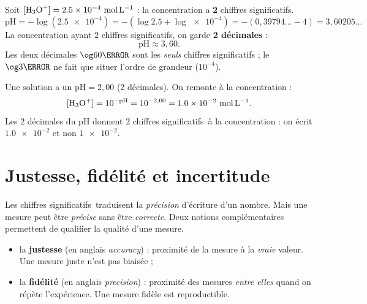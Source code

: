 \documentclass[11pt,a4paper]{article}
\newcommand{\CS}{chiffres significatifs}
\begin{document}
\begin{exemple}
Soit $[\ce{H3O+}]=\num{2,5e-4}\ \si{\mol\per\litre}$ : la concentration a \textbf{2} \CS.
\[ \mathrm{pH}=-\log(\num{2,5e-4})=-(\log\num{2,5}+\log\num{e-4})
   =-(0{,}39794\ldots-4)=3{,}60205\ldots \]
La concentration ayant $2$ \CS, on garde \textbf{2 décimales} :
\[ \boxed{\mathrm{pH}\approx 3{,}60}. \]
Les deux décimales $\og 60\fg{}$ sont les \emph{seuls} chiffres significatifs ; le $\og 3\fg{}$ ne fait
que situer l'ordre de grandeur ($10^{-4}$).
\end{exemple}

\begin{exemple}
Une solution a un $\mathrm{pH}=2{,}00$ (2 décimales). On remonte à la concentration :
\[ [\ce{H3O+}]=10^{-\mathrm{pH}}=10^{-2,00}=\num{1,0e-2}\ \si{\mol\per\litre}. \]
Les $2$ décimales du pH donnent $2$ \CS\ à la concentration : on écrit $\num{1,0e-2}$ et non
$\num{1e-2}$.
\end{exemple}

\section{Justesse, fidélité et incertitude}
Les \CS\ traduisent la \emph{précision} d'écriture d'un nombre. Mais une mesure peut être
\emph{précise} sans être \emph{correcte}. Deux notions complémentaires permettent de qualifier la
qualité d'une mesure.

\begin{definition}
\begin{itemize}[leftmargin=1.6em,topsep=2pt,itemsep=2pt]
  \item la \textbf{justesse} (en anglais \emph{accuracy}) : proximité de la mesure à la \emph{vraie}
        valeur. Une mesure juste n'est pas \og biaisée\fg{} ;
  \item la \textbf{fidélité} (en anglais \emph{precision}) : proximité des mesures \emph{entre elles}
        quand on répète l'expérience. Une mesure fidèle est \og reproductible\fg{}.
\end{itemize}
\end{definition}
\end{document}
